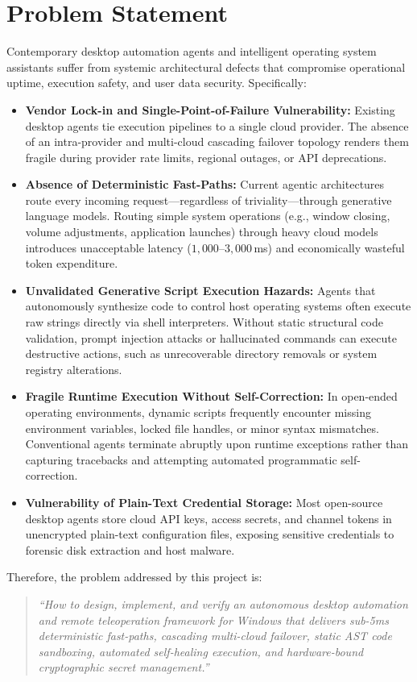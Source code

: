 \documentclass[12pt,letterpaper,oneside]{report}
\begin{document}
\section{Problem Statement}
Contemporary desktop automation agents and intelligent operating system assistants suffer from systemic architectural defects that compromise operational uptime, execution safety, and user data security. Specifically:
\begin{itemize}
    \item \textbf{Vendor Lock-in and Single-Point-of-Failure Vulnerability:} Existing desktop agents tie execution pipelines to a single cloud provider. The absence of an intra-provider and multi-cloud cascading failover topology renders them fragile during provider rate limits, regional outages, or API deprecations.
    \item \textbf{Absence of Deterministic Fast-Paths:} Current agentic architectures route every incoming request—regardless of triviality—through generative language models. Routing simple system operations (e.g., window closing, volume adjustments, application launches) through heavy cloud models introduces unacceptable latency ($1{,}000$--$3{,}000$\,ms) and economically wasteful token expenditure.
    \item \textbf{Unvalidated Generative Script Execution Hazards:} Agents that autonomously synthesize code to control host operating systems often execute raw strings directly via shell interpreters. Without static structural code validation, prompt injection attacks or hallucinated commands can execute destructive actions, such as unrecoverable directory removals or system registry alterations.
    \item \textbf{Fragile Runtime Execution Without Self-Correction:} In open-ended operating environments, dynamic scripts frequently encounter missing environment variables, locked file handles, or minor syntax mismatches. Conventional agents terminate abruptly upon runtime exceptions rather than capturing tracebacks and attempting automated programmatic self-correction.
    \item \textbf{Vulnerability of Plain-Text Credential Storage:} Most open-source desktop agents store cloud API keys, access secrets, and channel tokens in unencrypted plain-text configuration files, exposing sensitive credentials to forensic disk extraction and host malware.
\end{itemize}

Therefore, the problem addressed by this project is:
\begin{quote}
\textit{``How to design, implement, and verify an autonomous desktop automation and remote teleoperation framework for Windows that delivers sub-5ms deterministic fast-paths, cascading multi-cloud failover, static AST code sandboxing, automated self-healing execution, and hardware-bound cryptographic secret management.''}
\end{quote}
\end{document}
